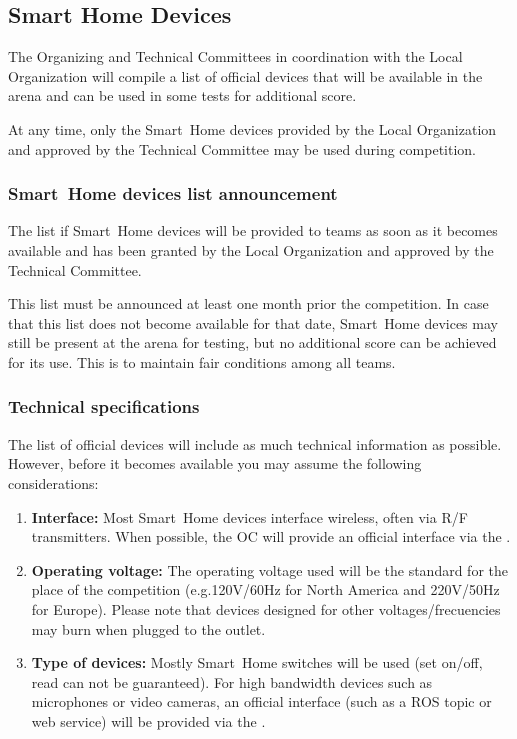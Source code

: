 \subsection{Smart Home Devices}
\label{rule:smarthomedevices}

The Organizing and Technical Committees in coordination with the Local Organization will compile a list of  official devices that will be available in the arena and can be used in some tests for additional score.

At any time, only the Smart~Home devices provided by the Local Organization and approved by the Technical Committee may be used during competition.

\subsubsection{Smart~Home devices list announcement}
The list if Smart~Home devices will be provided to teams as soon as it becomes available and has been granted by the Local Organization and approved by the Technical Committee.

This list must be announced at least one month prior the competition. In case that this list does not become available for that date, Smart~Home devices may still be present at the arena for testing, but no additional score can be achieved for its use. This is to maintain fair conditions among all teams.

\subsubsection{Technical specifications}
The list of  official devices will include as much technical information as possible. However, before it becomes available you may assume the following considerations:

\begin{enumerate}
	\item \textbf{Interface:} Most Smart~Home devices interface wireless, often via R/F transmitters. When possible, the OC will provide an official interface via the .
	\item \textbf{Operating voltage:} The operating voltage used will be the standard for the place of the competition (e.g.120V/60Hz for North America and 220V/50Hz for Europe). Please note that devices designed for other voltages/frecuencies may burn when plugged to the outlet.
	\item \textbf{Type of devices:} Mostly Smart~Home switches will be used (set on/off, read can not be guaranteed). For high bandwidth devices such as microphones or video cameras, an official interface (such as a ROS topic or web service) will be provided via the .
\end{enumerate}

